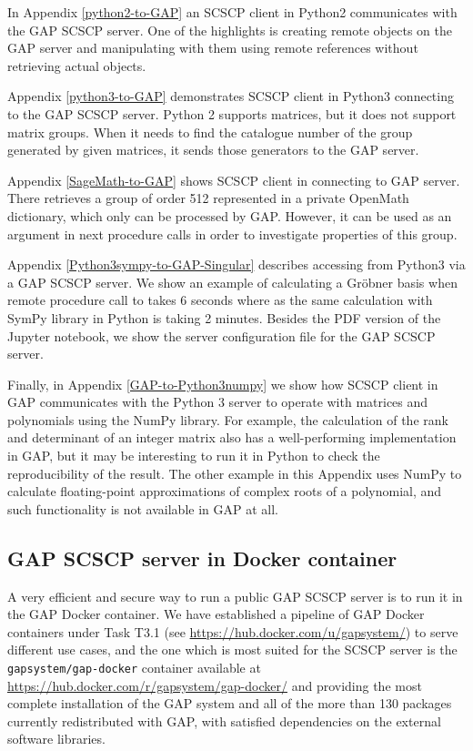 \documentclass{deliverablereport}
\begin{document}
In Appendix \ref{python2-to-GAP} an SCSCP client in Python2 
communicates with the GAP SCSCP server. One of the highlights is
creating remote objects on the GAP server and manipulating
with them using remote references without retrieving actual
objects.

Appendix \ref{python3-to-GAP} demonstrates SCSCP client in 
Python3 connecting to the GAP SCSCP server. Python 2 supports
matrices, but it does not support matrix groups. When it needs
to find the catalogue number of the group generated by given
matrices, it sends those generators to the GAP server.

Appendix \ref{SageMath-to-GAP} shows SCSCP client in \Sage 
connecting to GAP server. There \Sage retrieves a group of order
512 represented in a private OpenMath dictionary, which only
can be processed by GAP. However, it can be used as an argument
in next procedure calls in order to investigate properties of 
this group.

Appendix \ref{Python3sympy-to-GAP-Singular} describes
accessing \Singular from Python3 via a GAP SCSCP server. 
We show an example of calculating a Gr\"obner basis when
remote procedure call to \Singular takes 6 seconds where
as the same calculation with SymPy library in Python is
taking 2 minutes. Besides the PDF version of the Jupyter
notebook, we show the server configuration file for the
GAP SCSCP server.

Finally, in Appendix \ref{GAP-to-Python3numpy} we show how
SCSCP client in GAP communicates with the Python 3 server
to operate with matrices and polynomials using the NumPy
library. For example, the calculation of the rank and
determinant of an integer matrix also has a well-performing
implementation in GAP, but it may be interesting to run
it in Python to check the reproducibility of the result.
The other example in this Appendix uses NumPy to calculate
floating-point approximations of complex roots of a 
polynomial, and such functionality is not available in GAP
at all.


\subsection{GAP SCSCP server in Docker container}\label{gap-docker}

A very efficient and secure way to run a public GAP SCSCP
server is to run it in the GAP Docker container. 
We have established a pipeline of GAP Docker containers
under Task T3.1 (see \url{https://hub.docker.com/u/gapsystem/})
to serve different use cases, and the one which is most
suited for the SCSCP server is the {\tt gapsystem/gap-docker} 
container available at \url{https://hub.docker.com/r/gapsystem/gap-docker/} and
providing the most complete installation
of the GAP system and all of the more than 130 packages
currently redistributed with GAP, with satisfied dependencies
on the external software libraries.
\end{document}
